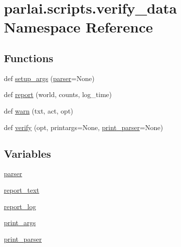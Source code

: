 \hypertarget{namespaceparlai_1_1scripts_1_1verify__data}{}\section{parlai.\+scripts.\+verify\+\_\+data Namespace Reference}
\label{namespaceparlai_1_1scripts_1_1verify__data}
\subsection*{Functions}
\begin{DoxyCompactItemize}
\item 
def \hyperlink{namespaceparlai_1_1scripts_1_1verify__data_aecfb15331606adc88ee4221c2945a17d}{setup\+\_\+args} (\hyperlink{namespaceparlai_1_1scripts_1_1verify__data_ad430ef810be6da6ae7a18c533d96565b}{parser}=None)
\item 
def \hyperlink{namespaceparlai_1_1scripts_1_1verify__data_a26153466b8f1f0c901768b4b3c56c885}{report} (world, counts, log\+\_\+time)
\item 
def \hyperlink{namespaceparlai_1_1scripts_1_1verify__data_ab1f264e6d69b1abe3399ba05512f8c66}{warn} (txt, act, opt)
\item 
def \hyperlink{namespaceparlai_1_1scripts_1_1verify__data_acf6da63d62b2bf71c8fb7860e944a5bf}{verify} (opt, printargs=None, \hyperlink{namespaceparlai_1_1scripts_1_1verify__data_a60c3d2c8e563b7461b6dd38ed5c389c5}{print\+\_\+parser}=None)
\end{DoxyCompactItemize}
\subsection*{Variables}
\begin{DoxyCompactItemize}
\item 
\hyperlink{namespaceparlai_1_1scripts_1_1verify__data_ad430ef810be6da6ae7a18c533d96565b}{parser}
\item 
\hyperlink{namespaceparlai_1_1scripts_1_1verify__data_ac7d7cb0342b938344a59be68a200cda0}{report\+\_\+text}
\item 
\hyperlink{namespaceparlai_1_1scripts_1_1verify__data_a72869030307af42a4d0fa97aa1f07bcf}{report\+\_\+log}
\item 
\hyperlink{namespaceparlai_1_1scripts_1_1verify__data_a8b8065bd7632280e00bd3407e0ace437}{print\+\_\+args}
\item 
\hyperlink{namespaceparlai_1_1scripts_1_1verify__data_a60c3d2c8e563b7461b6dd38ed5c389c5}{print\+\_\+parser}
\end{DoxyCompactItemize}


